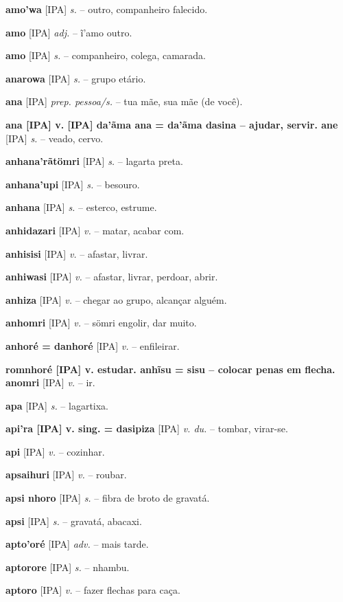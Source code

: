 \textbf{amo'wa} [IPA] \textit{s.} -- outro, companheiro falecido.

\textbf{amo} [IPA] \textit{adj.} -- ĩ'amo outro.

\textbf{amo} [IPA] \textit{s.} -- companheiro, colega, camarada.

\textbf{anarowa} [IPA] \textit{s.} -- grupo etário.

\textbf{ana} [IPA] \textit{prep. pessoa/s.} -- tua mãe, sua mãe (de você).

\textbf{ana [IPA] v. [IPA] da'ãma ana = da'ãma dasina -- ajudar, servir. ane} [IPA] \textit{s.} -- veado, cervo.

\textbf{anhana'rãtömri} [IPA] \textit{s.} -- lagarta preta.

\textbf{anhana'upi} [IPA] \textit{s.} -- besouro.

\textbf{anhana} [IPA] \textit{s.} -- esterco, estrume.

\textbf{anhidazari} [IPA] \textit{v.} -- matar, acabar com.

\textbf{anhisisi} [IPA] \textit{v.} -- afastar, livrar.

\textbf{anhiwasi} [IPA] \textit{v.} -- afastar, livrar, perdoar, abrir.

\textbf{anhiza} [IPA] \textit{v.} -- chegar ao grupo, alcançar alguém.

\textbf{anhomri} [IPA] \textit{v.} -- sömri engolir, dar muito.

\textbf{anhoré = danhoré} [IPA] \textit{v.} -- enfileirar.

\textbf{romnhoré [IPA] v. estudar. anhĩsu = sisu -- colocar penas em flecha. anomri} [IPA] \textit{v.} -- ir.

\textbf{apa} [IPA] \textit{s.} -- lagartixa.

\textbf{api'ra [IPA] v. sing. = dasipiza} [IPA] \textit{v. du.} -- tombar, virar-se.

\textbf{api} [IPA] \textit{v.} -- cozinhar.

\textbf{apsaihuri} [IPA] \textit{v.} -- roubar.

\textbf{apsi nhoro} [IPA] \textit{s.} -- fibra de broto de gravatá.

\textbf{apsi} [IPA] \textit{s.} -- gravatá, abacaxi.

\textbf{apto'oré} [IPA] \textit{adv.} -- mais tarde.

\textbf{aptorore} [IPA] \textit{s.} -- nhambu.

\textbf{aptoro} [IPA] \textit{v.} -- fazer flechas para caça.


